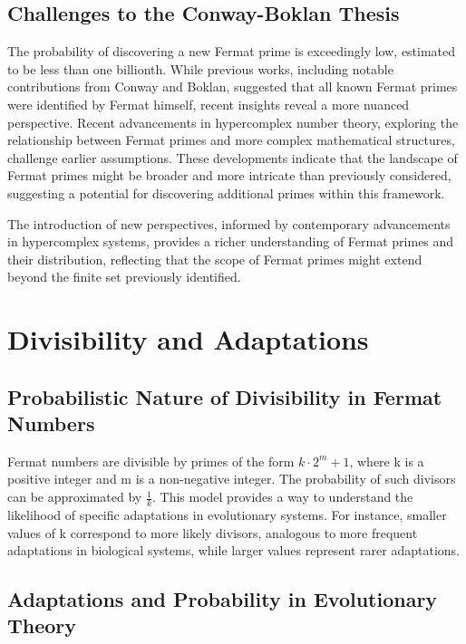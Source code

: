 \documentclass[12pt]{article}
\begin{document}
\subsection{Challenges to the Conway-Boklan Thesis}

The probability of discovering a new Fermat prime is exceedingly low, estimated to be less than one billionth. While previous works, including notable contributions from Conway and Boklan, suggested that all known Fermat primes were identified by Fermat himself, recent insights reveal a more nuanced perspective. Recent advancements in hypercomplex number theory, exploring the relationship between Fermat primes and more complex mathematical structures, challenge earlier assumptions. These developments indicate that the landscape of Fermat primes might be broader and more intricate than previously considered, suggesting a potential for discovering additional primes within this framework.

The introduction of new perspectives, informed by contemporary advancements in hypercomplex systems, provides a richer understanding of Fermat primes and their distribution, reflecting that the scope of Fermat primes might extend beyond the finite set previously identified.

\section{Divisibility and Adaptations}

\subsection{Probabilistic Nature of Divisibility in Fermat Numbers}

Fermat numbers are divisible by primes of the form \( k \cdot 2^m + 1 \), where 
k is a positive integer and m is a non-negative integer. The probability of such divisors can be approximated by \( \frac{1}{k} \). This model provides a way to understand the likelihood of specific adaptations in evolutionary systems. For instance, smaller values of 
k correspond to more likely divisors, analogous to more frequent adaptations in biological systems, while larger values represent rarer adaptations.

\subsection{Adaptations and Probability in Evolutionary Theory}
\end{document}
